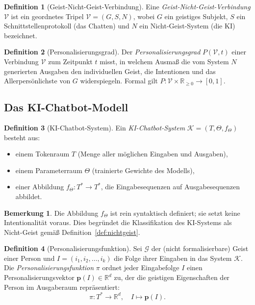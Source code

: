 ﻿\documentclass[a4paper,12pt]{article}
\theoremstyle{definition}
\newtheorem{definition}{Definition}
\newtheorem{bemerkung}{Bemerkung}
\begin{document}
\begin{definition}[Geist-Nicht-Geist-Verbindung]
\label{def:verbindung}
Eine \emph{Geist-Nicht-Geist-Verbindung} $\mathcal{V}$ ist ein geordnetes Tripel
$\mathcal{V} = (G, S, N)$, wobei $G$ ein geistiges Subjekt, $S$ ein Schnittstellenprotokoll
(das Chatten) und $N$ ein Nicht-Geist-System (die KI) bezeichnet.
\end{definition}

\begin{definition}[Personalisierungsgrad]
\label{def:pers}
Der \emph{Personalisierungsgrad} $P(\mathcal{V}, t)$ einer Verbindung $\mathcal{V}$ zum
Zeitpunkt $t$ misst, in welchem Ausmaß die vom System $N$ generierten Ausgaben den
individuellen Geist, die Intentionen und das Allerpersönlichste von $G$ widerspiegeln.
Formal gilt $P : \mathcal{V} \times \mathbb{R}_{\geq 0} \to [0,1]$.
\end{definition}

\subsection{Das KI-Chatbot-Modell}

\begin{definition}[KI-Chatbot-System]
\label{def:kichat}
Ein \emph{KI-Chatbot-System} $\mathcal{K} = (T, \Theta, f_\Theta)$ besteht aus:
\begin{itemize}
    \item einem Tokenraum $T$ (Menge aller möglichen Eingaben und Ausgaben),
    \item einem Parameterraum $\Theta$ (trainierte Gewichte des Modells),
    \item einer Abbildung $f_\Theta : T^* \to T^*$, die Eingabesequenzen auf
          Ausgabesequenzen abbildet.
\end{itemize}
\end{definition}

\begin{bemerkung}
Die Abbildung $f_\Theta$ ist rein syntaktisch definiert; sie setzt keine Intentionalität
voraus. Dies begründet die Klassifikation des KI-Systems als Nicht-Geist gemäß
Definition~\ref{def:nichtgeist}.
\end{bemerkung}

\begin{definition}[Personalisierungsfunktion]
\label{def:pfunc}
Sei $\mathcal{G}$ der (nicht formalisierbare) Geist einer Person und
$I = (i_1, i_2, \ldots, i_k)$ die Folge ihrer Eingaben in das System $\mathcal{K}$.
Die \emph{Personalisierungsfunktion} $\pi$ ordnet jeder Eingabefolge $I$ einen
Personalisierungsvektor $\mathbf{p}(I) \in \mathbb{R}^d$ zu, der die geistigen
Eigenschaften der Person im Ausgaberaum repräsentiert:
\[
    \pi : T^* \longrightarrow \mathbb{R}^d, \quad I \mapsto \mathbf{p}(I).
\]
\end{definition}
\end{document}

